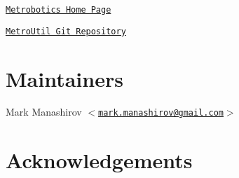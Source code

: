 \begin{DoxyItemize}
\item \href{http://bots.sci.brooklyn.cuny.edu/metrobotics/}{\tt \-Metrobotics \-Home \-Page}  
\item \href{http://github.com/Arkainium/MetroUtil}{\tt \-Metro\-Util \-Git \-Repository}  
\end{DoxyItemize}\hypertarget{index_main_maintainers}{}\section{\-Maintainers}\label{index_main_maintainers}

\begin{DoxyItemize}
\item \-Mark \-Manashirov $<$\href{mailto:mark.manashirov@gmail.com}{\tt mark.\-manashirov@gmail.\-com}$>$  
\end{DoxyItemize}\hypertarget{index_main_acknowledgements}{}\section{\-Acknowledgements}\label{index_main_acknowledgements}
